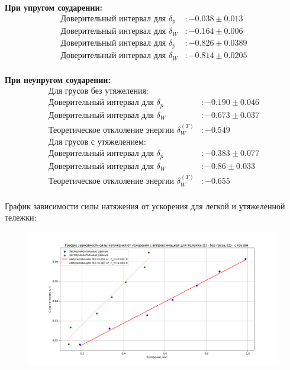 \documentclass[a4paper]{article}
\begin{document}
\begin{center}
\textbf{При упругом соударении:}
\begin{align*}
\text{Доверительный интервал для } \delta_p &: -0.038 \pm 0.013 \\
\text{Доверительный интервал для } \delta_W &: -0.164 \pm 0.006 \\
\text{Доверительный интервал для } \delta_p &: -0.826 \pm 0.0389\\
\text{Доверительный интервал для } \delta_W &: -0.814 \pm 0.0205\\
\end{align*}

\textbf{При неупругом соударении:}
\begin{align*}
\text{Для грусов без утяжеления:}\\
\text{Доверительный интервал для } \delta_p &: -0.190 \pm 0.046 \\
\text{Доверительный интервал для } \delta_W &: -0.673 \pm 0.037 \\
\text{Теоретическое отклоление энергии } \delta_W^{(T)} &: -0.549 \\
\text{Для грусов с утяжелением:}\\
\text{Доверительный интервал для } \delta_p &: -0.383 \pm 0.077 \\
\text{Доверительный интервал для } \delta_W &: -0.86 \pm 0.033 \\
\text{Теоретическое отклоление энергии } \delta_W^{(T)} &: -0.655\\
\end{align*}
\end{center}
График зависимости силы натяжения от ускорения для легкой и утяжеленной тележки:
\begin{figure}[H]
\begin{center}
\includegraphics[width=\textwidth, scale=0.5]{Figure_1.png}
\end{center}
\end{figure}
\end{document}
